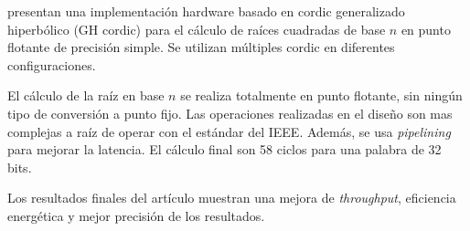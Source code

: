 \cite{wang_gh_2020} presentan una implementación hardware basado en \gls{cordic} generalizado hiperbólico (GH \gls{cordic}) para el cálculo de raíces cuadradas de base $n$ en punto flotante de precisión simple. Se utilizan múltiples \gls{cordic} en diferentes configuraciones.

El cálculo de la raíz en base $n$ se realiza totalmente en punto flotante, sin ningún tipo de conversión a punto fijo. Las operaciones realizadas en el diseño son mas complejas a raíz de operar con el estándar del IEEE. Además, se usa \textit{pipelining} para mejorar la latencia. El cálculo final son 58 ciclos para una palabra de 32 bits.

Los resultados finales del artículo muestran una mejora de \textit{throughput}, eficiencia energética y mejor precisión de los resultados. 














